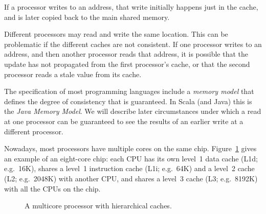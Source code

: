 If a processor writes to an address, that write initially happens just in the
cache, and is later copied back to the main shared memory.

Different processors may read and write the same location.  This can be
problematic if the different caches are not consistent.  If one processor
writes to an address, and then another processor reads that address, it is
possible that the update has not propagated from the first processor's cache,
or that the second processor reads a stale value from its cache.  

The specification of most programming languages include a \emph{memory model}
that defines the degree of consistency that is guaranteed.  In Scala (and
Java) this is the \emph{Java Memory Model}.  We will
describe later circumstances under which a read at one processor can be
guaranteed to see the results of an earlier write at a different processor.



Nowadays, most processors have multiple cores on the same chip.
Figure~\ref{fig:multicore} gives an example of an eight-core chip: each CPU
has its own level~1 data cache (L1d; e.g.~16K), shares a level~1 instruction
cache (L1i; e.g.~64K) and a level~2 cache (L2; e.g.~2048K) with another CPU,
and shares a level~3 cache (L3; e.g.~8192K) with all the CPUs on the chip.


\begin{figure}
\begin{center}
\end{center}
\caption{A multicore processor with hierarchical caches.}
\label{fig:multicore}
\end{figure}

